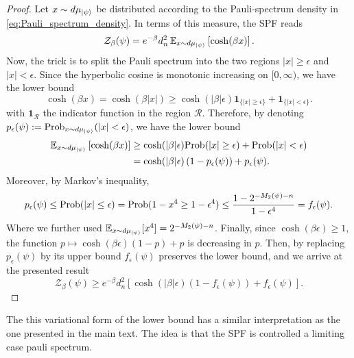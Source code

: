 \documentclass[aps,pra,superscriptaddress,twocolumn,longbibliography]{revtex4-2}
\begin{document}
\begin{proof}
Let $x\sim d\mu_{\ket{\psi}}$ be distributed according to the Pauli-spectrum density in \eqref{eq:Pauli_spectrum_density}. In terms of this measure, the SPF reads 
%
\begin{equation}
    \mathcal{Z}_{\beta}(\psi)= e^{-\beta}d_n^2\, \mathbb{E}_{x\sim d\mu_{\ket{\psi}}} \left[\cosh(\beta x)\right].
\end{equation}
%
Now, the trick is to split the Pauli spectrum into the two regions $|x|\geq\epsilon$ and $|x|<\epsilon$. Since the hyperbolic cosine is monotonic increasing on $[0,\infty)$, we have the lower bound
%
\begin{equation}
    \cosh(\beta x) = \cosh(\beta|x|) \geq \cosh(|\beta|\epsilon)\mathbf{1}_{\{|x|\geq\epsilon\}}+ \mathbf{1}_{\{|x|<\epsilon\}}.
\end{equation}
%
with $\mathbf{1}_{\mathcal{R}}$ the indicator function in the region $\mathcal{R}$. Therefore, by denoting $p_{\epsilon}(\psi) := {\rm Prob}_{x\sim d\mu_{\ket{\psi}}}(|x|<\epsilon)$, we have the lower bound
%
\begin{align}
    \mathbb{E}_{x\sim d\mu_{\ket{\psi}}}
    \left[\cosh(\beta x)\right] &\geq \cosh(|\beta|\epsilon) {\rm Prob}(|x|\geq\epsilon) +  {\rm Prob}(|x|<\epsilon)\nonumber \\
    &= \cosh(|\beta|\epsilon) \left(1-p_{\epsilon}(\psi)\right)  +  p_{\epsilon}(\psi).
\end{align}
%
Moreover, by Markov's inequality,
%
\begin{align}
    p_{\epsilon}(\psi) \leq
    {\rm Prob}(|x|\leq\epsilon) \nonumber =
    {\rm Prob}(1-x^4\geq1-\epsilon^4) \nonumber \leq
    \frac{1- 2^{-M_{2}(\psi)-n}}{1-\epsilon^4 }=
    f_{\epsilon}(\psi).
\end{align}
%
Where we further used $\mathbb{E}_{x\sim d\mu_{\ket{\psi}}}[x^4]=2^{-M_{2}(\psi)-n}$. Finally, since $\cosh(\beta\epsilon)\geq 1$, the function $p\mapsto \cosh(\beta\epsilon)(1-p)+p$ is decreasing in $p$. Then, by replacing $p_{\epsilon}(\psi)$ by its upper bound $f_{\epsilon}(\psi)$ preserves the lower bound, and we arrive at the presented result
%
\begin{equation}
    \mathcal{Z}_{\beta}(\psi) \geq e^{-\beta}d_n^2
    \left[ \cosh(|\beta|\epsilon)\left(1-f_{\epsilon}(\psi)\right) + f_{\epsilon}(\psi) \right].
\end{equation}
\end{proof}

The this variational form of the lower bound has a similar interpretation as the one presented in the main text. The idea is that the SPF is controlled a limiting case pauli spectrum.
\end{document}
